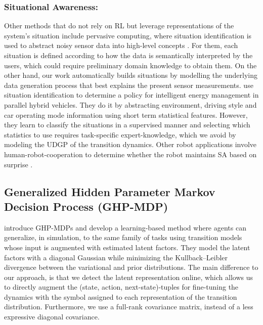 \documentclass[Afour,sageh,times]{sagej}
\theoremstyle{lemma}
\begin{document}
\subsubsection{Situational Awareness:}
Other methods that do not rely on RL but leverage representations of the system's situation include pervasive computing, where situation identification is used to abstract noisy sensor data into high-level concepts \cite[]{ye2012situation}. For them, each situation is defined according to how the data is semantically interpreted by the users, which could require preliminary domain knowledge to obtain them. On the other hand, our work automatically builds situations by modelling the underlying data generation process that best explains the present sensor measurements. \citet{langari2005intelligent} use situation identification to determine a policy for intelligent energy management in parallel hybrid vehicles. They do it by abstracting environment, driving style and car operating mode information using short term statistical features. However, they learn to classify the situations in a supervised manner and selecting which statistics to use requires task-specific expert-knowledge, which we avoid by modeling the UDGP of the transition dynamics. Other robot applications involve human-robot-cooperation to determine whether the robot maintains SA based on surprise \cite[]{dahn2018situation}. 

\subsection{Generalized Hidden Parameter Markov Decision Process (GHP-MDP)}

\cite{perez2020generalized} introduce GHP-MDPs and develop a learning-based method where agents can generalize, in simulation, to the same family of tasks using transition models whose input is augmented with estimated latent factors. They model the latent factors with a diagonal Gaussian while minimizing the Kullback–Leibler divergence between the variational and prior distributions. The main difference to our approach, is that we detect the latent representation online, which allows us to directly augment the (state, action, next-state)-tuples for fine-tuning the dynamics with the symbol assigned to each representation of the transition distribution. Furthermore, we use a full-rank covariance matrix, instead of a less expressive diagonal covariance.
\end{document}
